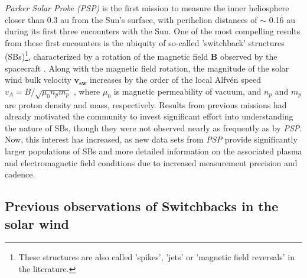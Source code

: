 \documentclass[]{aastex62}
\begin{document}
\emph{Parker Solar Probe (PSP)} is the first mission to measure the inner heliosphere closer than 0.3 au from the Sun's surface, with perihelion distances of $\sim$ 0.16 au during its first three encounters with the Sun. One of the most compelling results from these first encounters is the ubiquity of so-called 'switchback' structures (SBs)\footnote{These structures are also called 'spikes', 'jets' or 'magnetic field reversals' in the literature.}, characterized by a rotation of the magnetic field $\mathbf{B}$ observed by the spacecraft \citep{Kasper_2019_Nature,Bale_2019_Nature}. Along with the magnetic field rotation, the magnitude of the solar wind bulk velocity $\mathbf{v_{sw}}$ increases by the order of the local Alfv\'en speed $v_A = B / \sqrt{\mu_0 n_p m_p}$ \citep{Matteini_2014_GRL}, where $\mu_0$ is magnetic permeability of vacuum, and $n_p$ and $m_p$ are proton density and mass, respectively. Results from previous missions had already motivated the community to invest significant effort into understanding the nature of SBs, though they were not observed nearly as frequently as by \emph{PSP}. Now, this interest has increased, as new data sets from \emph{PSP} provide significantly larger populations of SBs and more detailed information on the associated plasma and electromagnetic field conditions due to increased measurement precision and cadence. 


\subsection{Previous observations of Switchbacks in the solar wind}
\label{sec:Intro_Observations}
\end{document}
